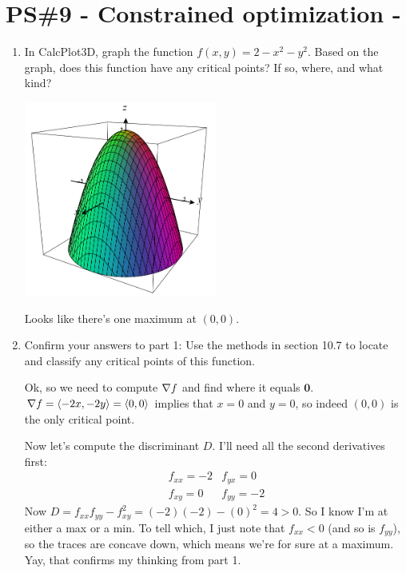 


%


\allowdisplaybreaks
\section{PS\#9 - Constrained optimization -  }


\begin{enumerate}[leftmargin=0pt]
    
    \item In CalcPlot3D, graph the function $f(x,y) = 2- x^2 - y^2$. Based on the graph, does this function have any critical points? If so, where, and what kind?
    \begin{center}
        \includegraphics[width=0.5\textwidth]{../images/constrained-optimization/plot1.png}
    \end{center}
    
    \begin{red}
    Looks like there's one maximum at $(0,0)$.
    \end{red}
    \item Confirm your answers to part 1: Use the methods in section 10.7 to locate and classify any critical points of this function.
    
    \begin{red}
    Ok, so we need to compute $\nabla f$ and find where it equals $\mathbf{0}$. $\nabla f = \langle -2x, -2y\rangle = \langle0, 0\rangle$ implies that $x=0$ and $y=0$, so indeed $(0, 0)$ is the only critical point.
    
    Now let's compute the discriminant $D$. I'll need all the second derivatives first:
    \[\begin{array}{cc}
        f_{xx} = -2 & f_{yx} = 0 \\
        f_{xy} = 0 & f_{yy} = -2
    \end{array}
    \]
    Now $D = f_{xx} f_{yy} - f_{xy}^2 = (-2)(-2) - (0)^2 = 4 > 0$. So I know I'm at either a max or a min. To tell which, I just note that $f_{xx} < 0$ (and so is $f_{yy}$), so the traces are concave down, which means we're for sure at a maximum. Yay, that confirms my thinking from part 1.
    \end{red}
    

\end{enumerate}
